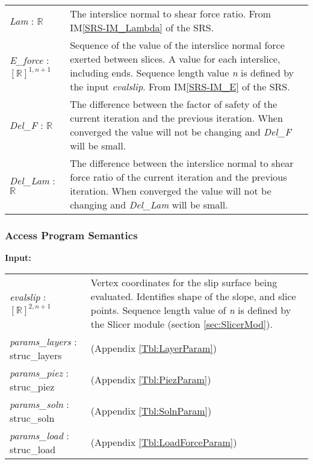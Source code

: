 \documentclass[12pt]{article}
\begin{document}
\renewcommand*{\arraystretch}{1.5}
\begin{longtable}{ p{}  p{}}
  \textit{Lam} : $\mathbb{R}$ & The interslice normal to shear force
  ratio. From IM\ref{SRS-IM_Lambda} of the SRS. \\

  \textit{E\_force} : $[\mathbb{R}]^{1,n+1}$ & Sequence of the value
  of the interslice normal force exerted between slices. A value for
  each interslice, including ends. Sequence length value \textit{n} is
  defined by the input \textit{evalslip}. From IM\ref{SRS-IM_E} of the
  SRS. \\

  \textit{Del\_F} : $\mathbb{R}$ & The difference between the factor
  of safety of the current iteration and the previous iteration. When
  converged the value will not be changing and \textit{Del\_F} will be
  small.\\

  \textit{Del\_Lam} : $\mathbb{R}$ & The difference between the
  interslice normal to shear force ratio of the current iteration and
  the previous iteration. When converged the value will not be
  changing and \textit{Del\_Lam} will be small.\\ 
\end{longtable}
 
\subsubsection{Access Program Semantics}

\textbf{Input:} 
\renewcommand*{\arraystretch}{1.5}
\begin{longtable}{p{} p{}}
  \textit{evalslip} : $[\mathbb{R}]^{2,n+1}$ & Vertex coordinates for
  the slip surface being evaluated. Identifies shape of the slope, and
  slice points. Sequence length value of \textit{n} is defined by the
  Slicer module (section \ref{sec:SlicerMod}).\\

  \textit{params\_layers} : struc\_layers & (Appendix
  \ref{Tbl:LayerParam})\\

  \textit{params\_piez} : struc\_piez & (Appendix
  \ref{Tbl:PiezParam})\\

  \textit{params\_soln} : struc\_soln & (Appendix
  \ref{Tbl:SolnParam})\\

  \textit{params\_load} : struc\_load & (Appendix
  \ref{Tbl:LoadForceParam})
\end{longtable}
\end{document}
